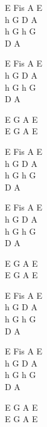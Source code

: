 \begin{chord}
    E Fis A E\\
    h G D A\\
    h G h G\\
    D A
	
    E Fis A E\\
    h G D A\\
    h G h G\\
    D A

    E G A E\\
    E G A E

    E Fis A E\\
    h G D A\\
    h G h G\\
    D A
	
    E Fis A E\\
    h G D A\\
    h G h G\\
    D A

    E G A E\\
    E G A E

    E Fis A E\\
    h G D A\\
    h G h G\\
    D A
	
    E Fis A E\\
    h G D A\\
    h G h G\\
    D A

    E G A E\\
    E G A E
\end{chord}
